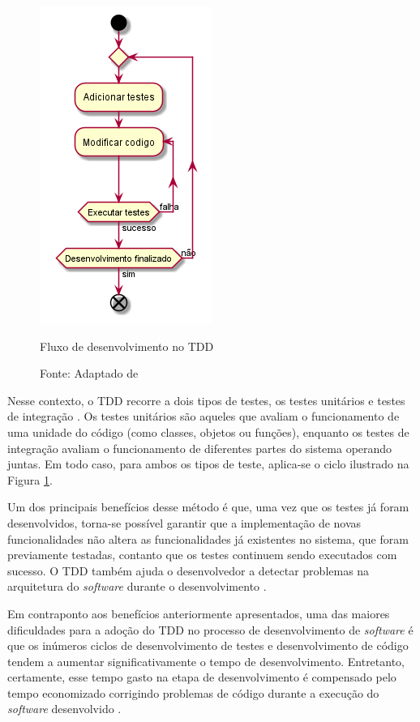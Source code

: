 \begin{figure}[!htb]
  \centering
  \includegraphics[width=.33\textwidth]{../out/diagrams/tdd/tdd.png}
  \smallskip
  \caption{Fluxo de desenvolvimento no TDD}
  \caption*{Fonte: Adaptado de }
  \label{fig:tdd_flow}
\end{figure}

Nesse contexto, o TDD recorre a dois tipos de testes, os testes unitários e
testes de integração \cite{ambler_2006}. Os testes unitários são aqueles que
avaliam o funcionamento de uma unidade do código (como classes, objetos ou
funções), enquanto os testes de integração avaliam o funcionamento de diferentes
partes do sistema operando juntas. Em todo caso, para ambos os tipos de teste,
aplica-se o ciclo ilustrado na Figura \ref{fig:tdd_flow}.

Um dos principais benefícios desse método é que, uma vez que os testes já foram
desenvolvidos, torna-se possível garantir que a implementação de novas
funcionalidades não altera as funcionalidades já existentes no sistema, que
foram previamente testadas, contanto que os testes continuem sendo executados
com sucesso. O TDD também ajuda o desenvolvedor a detectar problemas na
arquitetura do \textit{software} durante o desenvolvimento
\cite{test_driven_2013}.

Em contraponto aos benefícios anteriormente apresentados, uma das maiores
dificuldades para a adoção do TDD no processo de desenvolvimento de
\textit{software} é que os inúmeros ciclos de desenvolvimento de testes e
desenvolvimento de código tendem a aumentar significativamente o tempo de
desenvolvimento. Entretanto, certamente, esse tempo gasto na etapa de
desenvolvimento é compensado pelo tempo economizado corrigindo problemas de
código durante a execução do \textit{software} desenvolvido
\cite{test_driven_2013}.

